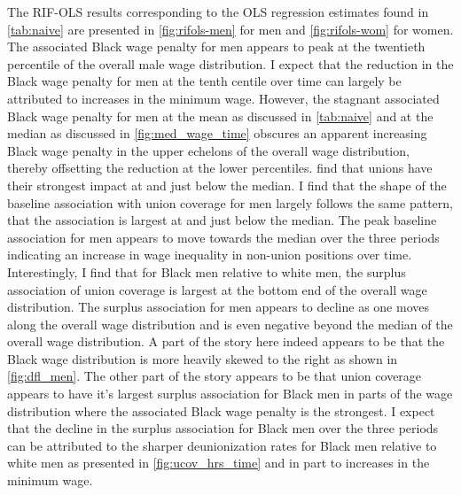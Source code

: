 \documentclass[11pt]{article}
\begin{document}
The RIF-OLS results corresponding to the OLS regression estimates found in \autoref{tab:naive} are presented in \autoref{fig:rifols-men} for men and \autoref{fig:rifols-wom} for women. The associated Black wage penalty for men appears to peak at the twentieth percentile of the overall male wage distribution. I expect that the reduction in the Black wage penalty for men at the tenth centile over time can largely be attributed to increases in the minimum wage. However, the stagnant associated Black wage penalty for men at the mean as discussed in \autoref{tab:naive} and at the median as discussed in \autoref{fig:med_wage_time} obscures an apparent increasing Black wage penalty in the upper echelons of the overall wage distribution, thereby offsetting the reduction at the lower percentiles. \citet{fll2021} find that unions have their strongest impact at and just below the median. I find that the shape of the baseline association with union coverage for men largely follows the same pattern, that the association is largest at and just below the median. The peak baseline association for men appears to move towards the median over the three periods indicating an increase in wage inequality in non-union positions over time. Interestingly, I find that for Black men relative to white men, the surplus association of union coverage is largest at the bottom end of the overall wage distribution. The surplus association for men appears to decline as one moves along the overall wage distribution and is even negative beyond the median of the overall wage distribution. A part of the story here indeed appears to be that the Black wage distribution is more heavily skewed to the right as shown in \autoref{fig:dfl_men}. The other part of the story appears to be that union coverage appears to have it's largest surplus association for Black men in parts of the wage distribution where the associated Black wage penalty is the strongest. I expect that the decline in the surplus association for Black men over the three periods can be attributed to the sharper deunionization rates for Black men relative to white men as presented in \autoref{fig:ucov_hrs_time} and in part to increases in the minimum wage.
\end{document}
